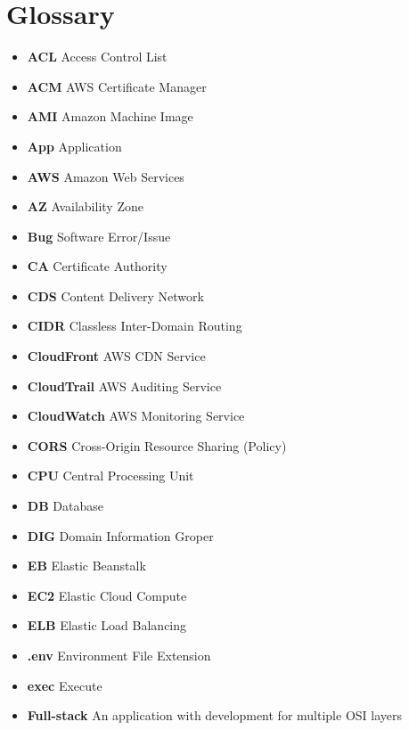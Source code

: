\beforeabstract
\afterabstract
\chapter{Glossary}\label{ch:glossary}

\begin{itemize}
    \item  \textbf{ACL} \textemdash Access Control List
    \item  \textbf{ACM} \textemdash AWS Certificate Manager
    \item  \textbf{AMI} \textemdash Amazon Machine Image
    \item  \textbf{App} \textemdash Application
    \item  \textbf{AWS} \textemdash Amazon Web Services
    \item  \textbf{AZ} \textemdash Availability Zone
    \item  \textbf{Bug} \textemdash Software Error/Issue
    \item  \textbf{CA} \textemdash Certificate Authority
    \item  \textbf{CDS} \textemdash Content Delivery Network
    \item  \textbf{CIDR} \textemdash Classless Inter-Domain Routing
    \item  \textbf{CloudFront} \textemdash AWS CDN Service
    \item  \textbf{CloudTrail} \textemdash AWS Auditing Service
    \item  \textbf{CloudWatch} \textemdash AWS Monitoring Service
    \item  \textbf{CORS} \textemdash Cross-Origin Resource Sharing (Policy)
    \item  \textbf{CPU} \textemdash Central Processing Unit
    \item  \textbf{DB} \textemdash Database
    \item  \textbf{DIG} \textemdash Domain Information Groper
    \item  \textbf{EB} \textemdash Elastic Beanstalk
    \item  \textbf{EC2} \textemdash Elastic Cloud Compute
    \item  \textbf{ELB} \textemdash Elastic Load Balancing
    \item  \textbf{.env} \textemdash Environment File Extension
    \item  \textbf{exec} \textemdash Execute
    \item  \textbf{Full-stack} \textemdash An application with development for multiple OSI layers

\end{itemize}

